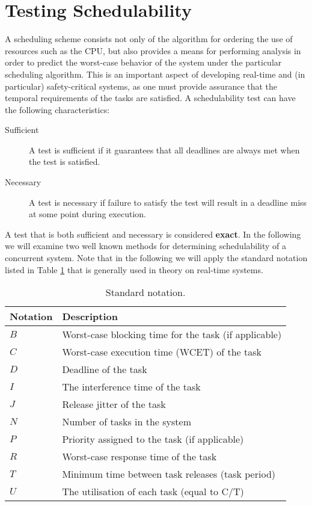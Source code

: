 \section{Testing Schedulability} %
\label{sec:schedulability_analysis}
A scheduling scheme consists not only of the algorithm for ordering the use of resources such as the CPU, but also provides a means for performing analysis in order to predict the worst-case behavior of the system under the particular scheduling algorithm. This is an important aspect of developing real-time and (in particular) safety-critical systems, as one must provide assurance that the temporal requirements of the tasks are satisfied. A schedulability test can have the following characteristics:
\begin{description}
	\item[Sufficient] A test is sufficient if it guarantees that all deadlines are always met when the test is satisfied.
	\item[Necessary] A test is necessary if failure to satisfy the test will result in a deadline miss at some point during execution.
\end{description}
A test that is both sufficient and necessary is considered \textbf{exact}. In the following we will examine two well known methods for determining schedulability of a concurrent system. Note that in the following we will apply the standard notation listed in Table \ref{table:ScheduleNotation} that is generally used in theory on real-time systems.
	\begin{table}[!ht]
			\centering
			\begin{tabular}{l l}
			\hline
			\textbf{Notation} & \textbf{Description}\\
			\hline 
			$B$ 	& Worst-case blocking time for the task (if applicable)  \\
			$C$ 	& Worst-case execution time (WCET) of the task \\
			$D$   & Deadline of the task \\
			$I$ 	& The interference time of the task \\
			$J$ 	& Release jitter of the task \\
			$N$ 	& Number of tasks in the system \\
			$P$ 	& Priority assigned to the task (if applicable) \\
			$R$ 	& Worst-case response time of the task \\
			$T$ 	& Minimum time between task releases (task period) \\
			$U$ 	& The utilisation of each task (equal to C/T) \\
			\hline
			\end{tabular}
			\caption{Standard notation\cite{alan2001real}.}
		\label{table:ScheduleNotation}
	\end{table}

